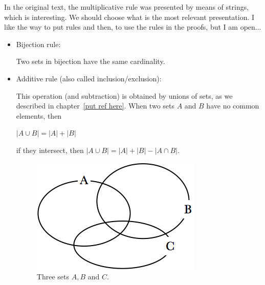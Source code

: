 {\Denis In the original text, the multiplicative rule was presented by means of strings, which is interesting. We should choose what is the most relevant presentation. I like the way to put rules and then, to use the rules in the proofs, but I am open...}

\begin{itemize}
\item
Bijection rule:

Two sets in bijection have the same cardinality.
\item
Additive rule (also called inclusion/exclusion):

This operation (and subtraction) is obtained by unions of sets, as we described in chapter~\ref{put ref here}.
When two sets $A$ and $B$ have no common elements, then

$|A \cup B| = |A| + |B|$

if they intersect, then $|A \cup B| = |A| + |B| - |A \cap B|$.
\begin{figure}[h]
\begin{center}
        \includegraphics[scale=0.4]{FiguresMaths/3sets}
        \caption{Three sets $A,B$ and $C$.}
        \label{fig:unionSetsInit}
\end{center}
\end{figure}


\end{itemize}
